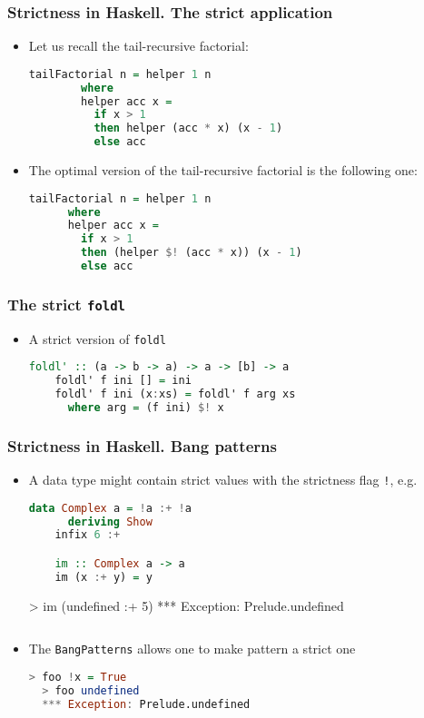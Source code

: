 \documentclass[10pt,pdf,utf8,russian,aspectratio=169]{beamer}
\begin{document}
\begin{frame}[fragile]
  \frametitle{Strictness in Haskell. The strict application}
  \begin{itemize}
    \item Let us recall the tail-recursive factorial:
    \begin{lstlisting}[language=Haskell]
      tailFactorial n = helper 1 n
        where
        helper acc x =
          if x > 1
          then helper (acc * x) (x - 1)
          else acc
    \end{lstlisting}
    \item The optimal version of the tail-recursive factorial is the following one:
    \begin{lstlisting}[language=Haskell]
    tailFactorial n = helper 1 n
      where
      helper acc x =
        if x > 1
        then (helper $! (acc * x)) (x - 1)
        else acc
      \end{lstlisting}
  \end{itemize}
\end{frame}

\begin{frame}[fragile]
  \frametitle{The strict \verb"foldl"}

  \begin{itemize}
    \item A strict version of \verb"foldl"
    \begin{lstlisting}[language=Haskell]
    foldl' :: (a -> b -> a) -> a -> [b] -> a
    foldl' f ini [] = ini
    foldl' f ini (x:xs) = foldl' f arg xs
      where arg = (f ini) $! x
    \end{lstlisting}
  \end{itemize}
\end{frame}

\begin{frame}[fragile]
  \frametitle{Strictness in Haskell. Bang patterns}
  \begin{itemize}
    \item A data type might contain strict values with the strictness flag \verb"!", e.g.
    \begin{lstlisting}[language=Haskell]
    data Complex a = !a :+ !a
      deriving Show
    infix 6 :+

    im :: Complex a -> a
    im (x :+ y) = y
    \end{lstlisting}
    > im (undefined :+ 5)
    *** Exception: Prelude.undefined
    \begin{lstlisting}[language=Haskell]
    \end{lstlisting}

  \item The \verb"BangPatterns" allows one to make pattern a strict one
  \begin{lstlisting}[language=Haskell]
  > foo !x = True
  > foo undefined
  *** Exception: Prelude.undefined
  \end{lstlisting}
  \end{itemize}
\end{frame}
\end{document}
